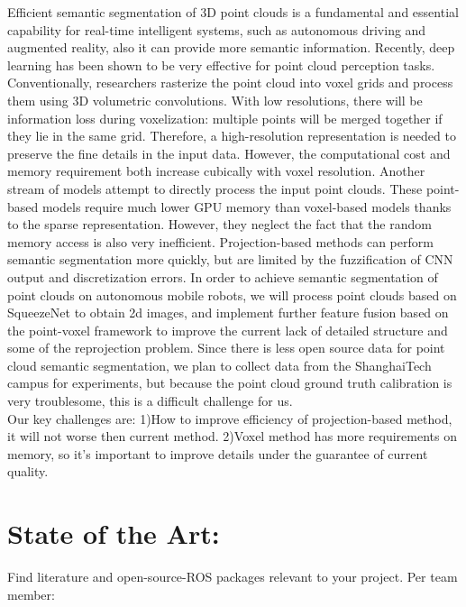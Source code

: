\documentclass{article}
\begin{document}
\begin{normalsize}
        Efficient semantic segmentation of 3D point clouds is a fundamental and essential capability for real-time intelligent systems, such as autonomous driving and augmented reality, also it can provide more semantic information. Recently, deep learning has been shown to be very effective for point cloud perception tasks. Conventionally, researchers rasterize the point cloud into voxel grids and process them using 3D volumetric convolutions. With low resolutions, there will be information loss during voxelization: multiple points will be merged together if they lie in the same grid. Therefore, a high-resolution representation is needed to preserve the fine details in the input data. However, the computational cost and memory requirement both increase cubically with voxel resolution. Another stream of models attempt to directly process the input point clouds. These point-based models require much lower GPU memory than voxel-based models thanks to the sparse representation. However, they neglect the fact that the random memory access is also very inefficient. Projection-based methods can perform semantic segmentation more quickly, but are limited by the fuzzification of CNN output and discretization errors. In order to achieve semantic segmentation of point clouds on autonomous mobile robots, we will process point clouds based on SqueezeNet to obtain 2d images, and implement further feature fusion based on the point-voxel framework to improve the current lack of detailed structure and some of the reprojection problem. Since there is less open source data for point cloud semantic segmentation, we plan to collect data from the ShanghaiTech campus for experiments, but because the point cloud ground truth calibration is very troublesome, this is a difficult challenge for us.\\
        Our key challenges are: 1)How to improve efficiency of projection-based method, it will not worse then current method. 2)Voxel method has more requirements on memory, so it’s important to improve details under the guarantee of current quality.
        
	   	\section{State of the Art:}
        
      Find literature and open-source-ROS packages relevant to your project. Per team member:
       
\begin{itemize}
   

\end{itemize}
\end{normalsize}
\end{document}
